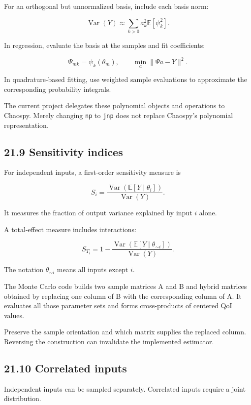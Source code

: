 \documentclass[11pt,a4paper]{article}
\begin{document}
For an orthogonal but unnormalized basis, include each basis norm:


\begingroup\small
\[
\operatorname{Var}(Y)
\approx\sum_{k>0}a_k^2\mathbb E[\psi_k^2].
\]
\endgroup


In regression, evaluate the basis at the samples and fit coefficients:


\begingroup\small
\[
\Psi_{mk}=\psi_k(\theta_m),\qquad
\min_a\|\Psi a-Y\|^2.
\]
\endgroup


In quadrature-based fitting, use weighted sample evaluations to approximate the corresponding probability integrals.

The current project delegates these polynomial objects and operations to Chaospy. Merely changing \texttt{np} to \texttt{jnp} does not replace Chaospy's polynomial representation.

\subsection{21.9 Sensitivity indices}
For independent inputs, a first-order sensitivity measure is


\begingroup\small
\[
S_i=
\frac{\operatorname{Var}(\mathbb E[Y\mid\theta_i])}
{\operatorname{Var}(Y)}.
\]
\endgroup


It measures the fraction of output variance explained by input \(i\) alone.

A total-effect measure includes interactions:


\begingroup\small
\[
S_{T_i}
=
1-\frac{
\operatorname{Var}(\mathbb E[Y\mid\theta_{\sim i}])
}{
\operatorname{Var}(Y)
}.
\]
\endgroup


The notation \(\theta_{\sim i}\) means all inputs except \(i\).

The Monte Carlo code builds two sample matrices A and B and hybrid matrices obtained by replacing one column of B with the corresponding column of A. It evaluates all those parameter sets and forms cross-products of centered QoI values.

Preserve the sample orientation and which matrix supplies the replaced column. Reversing the construction can invalidate the implemented estimator.

\subsection{21.10 Correlated inputs}
Independent inputs can be sampled separately. Correlated inputs require a joint distribution.
\end{document}
